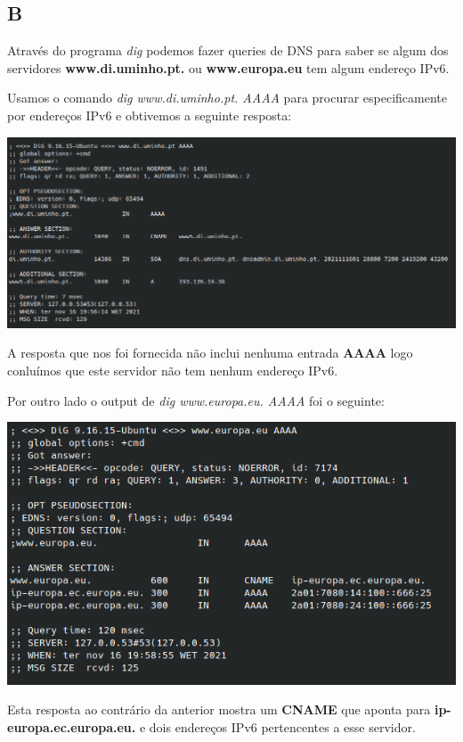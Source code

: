 \documentclass{report}
\begin{document}
        \subsection*{B}
                Através do programa \textit{dig} podemos fazer queries de DNS para saber se algum dos servidores \textbf{www.di.uminho.pt.} ou \textbf{www.europa.eu}
            tem algum endereço IPv6.\par
                Usamos o comando \textit{dig www.di.uminho.pt. AAAA} para procurar especificamente por endereços IPv6 e obtivemos a seguinte resposta:    
            \par
            \noindent
            \includegraphics[width=\textwidth]{images/dig_di.png}
            \par
                A resposta que nos foi fornecida não inclui nenhuma entrada \textbf{AAAA} logo conluímos que este servidor não tem nenhum endereço IPv6.

                \vspace{0.45em}
                Por outro lado o output de \textit{dig www.europa.eu. AAAA} foi o seguinte:
            \par
            \noindent
            \includegraphics[width=\textwidth]{images/dig_europa.png}
            \par
                Esta resposta ao contrário da anterior mostra um \textbf{CNAME} que aponta para \textbf{ip-europa.ec.europa.eu.} e dois endereços IPv6 pertencentes a esse servidor.
        \pagebreak
\end{document}
